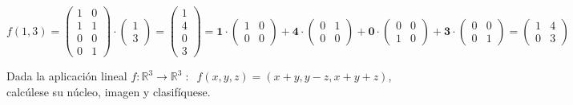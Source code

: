 \begin{proofw}
\noindent \textcolor{gris}{$f(1,3)=\left( \begin{matrix} 1&0\\1&1\\0&0\\0&1 \end{matrix} \right)\cdot \left( \begin{matrix} 1\\3 \end{matrix} \right)= \left( \begin{matrix} 1\\4\\0\\3 \end{matrix} \right) = 
\boldsymbol{1} \cdot \left( \begin{matrix} 1&0\\0&0 \end{matrix} \right)+
\boldsymbol{4} \cdot \left( \begin{matrix} 0&1\\0&0 \end{matrix} \right)+
\boldsymbol{0} \cdot \left( \begin{matrix} 0&0\\1&0 \end{matrix} \right)+
\boldsymbol{3} \cdot \left( \begin{matrix} 0&0\\0&1 \end{matrix} \right)=
\left( \begin{matrix} 1&4\\0&3 \end{matrix} \right)$}

\end{proofw}


\begin{ejre}
	Dada la aplicación lineal $f:\mathbb R^3 \to \mathbb R^3\; :\; \; f(x,y,z)=(x+y,y-z,x+y+z)$, calcúlese su núcleo, imagen y clasifíquese.
\end{ejre}


